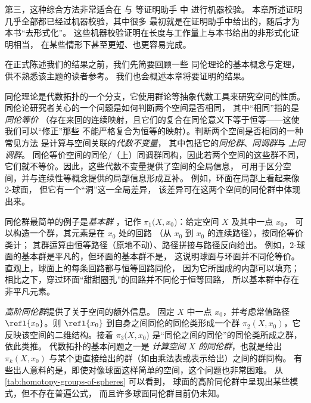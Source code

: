 %
%
第三，这种综合方法非常适合在 \Coq 与 \Agda 等证明助手 中
进行机器校验。
本章所述证明几乎全部都已经过机器校验，其中很多
最初就是在证明助手中给出的，随后才为本书“去形式化”。
这些机器校验证明在长度与工作量上与本书给出的非形式化证明相当，
在某些情形下甚至更短、也更容易完成。

\mentalpause

在正式陈述我们的结果之前，我们先简要回顾一些
同伦理论的基本概念与定理，供不熟悉该主题的读者参考。
我们也会概述本章将要证明的结果。

%
同伦理论是代数拓扑的一个分支，它使用群论等抽象代数工具来研究空间的性质。
同伦论研究者关心的一个问题是如何判断两个空间是否相同，
其中“相同”指的是\emph{同伦等价}
%
（存在来回的连续映射，且它们的复合在同伦意义下等于恒等——这使我们可以“修正”那些
不能严格复合为恒等的映射）。判断两个空间是否相同的一种常见方法
是计算与空间关联的\emph{代数不变量}，
其中包括它的\emph{同伦群}、\emph{同调群}与
\emph{上同调群}。
%
%
同伦等价空间的同伦/（上）同调群同构，因此若两个空间的这些群不同，
它们就不等价。因此，这些代数不变量提供了空间的全局信息，
可用于区分空间，并与连续性等概念提供的局部信息形成互补。
例如，环面在局部上看起来像 $2$-球面，
但它有一个“洞”这一全局差异，
该差异可在这两个空间的同伦群中体现出来。

同伦群最简单的例子是\emph{基本群}
%
，记作 $\pi_1(X,x_0$)：给定空间 $X$ 及其中一点 $x_0$，
可以构造一个群，其元素是在 $x_0$ 处的回路
（从 $x_0$ 到 $x_0$ 的连续路径），按同伦等价类计；
其群运算由恒等路径（原地不动）、路径拼接与路径反向给出。
例如，$2$-球面的基本群是平凡的，但环面的基本群不是，
这说明球面与环面并不同伦等价。
直观上，球面上的每条回路都与恒等回路同伦，
因为它所围成的内部可以填充；
相比之下，穿过环面“甜甜圈孔”的回路并不同伦于恒等回路，
所以基本群中存在非平凡元素。

\emph{高阶同伦群}提供了关于空间的额外信息。
固定 $X$ 中一点 $x_0$，并考虑常值路径
$\refl{x_0}$。则 $\refl{x_0}$ 到自身之间同伦的同伦类形成一个群
$\pi_2(X,x_0)$，它反映该空间的二维结构。接着 $\pi_3(X,x_0$)
是“同伦之间的同伦”的同伦类所成之群，依此类推。
代数拓扑的基本问题之一是
\emph{计算空间 $X$ 的同伦群}，也就是给出
$\pi_k(X,x_0)$ 与某个更直接给出的群（如由乘法表或表示给出）之间的群同构。
有些出人意料的是，即使对像球面这样简单的空间，这个问题也非常困难。
从 \cref{tab:homotopy-groups-of-spheres} 可以看到，
球面的高阶同伦群中呈现出某些模式，但不存在普遍公式，
而且许多球面同伦群目前仍未知。


